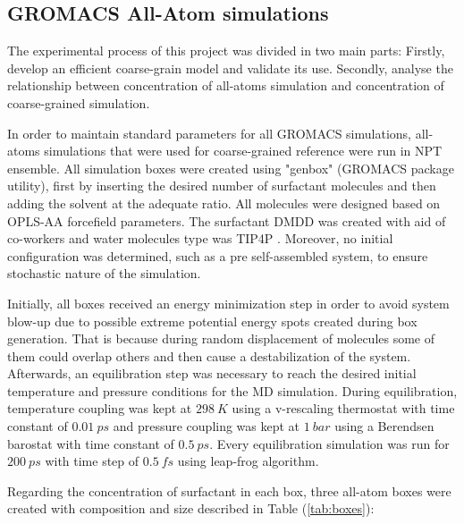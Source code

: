 \documentclass[10pt,a4paper,twoside]{article}
\begin{document}
\subsection{GROMACS All-Atom simulations}
The experimental process of this project was divided in two main parts: Firstly, develop an efficient coarse-grain model and validate its use. Secondly, analyse the relationship between concentration  of all-atoms simulation and concentration of coarse-grained simulation.

In order to maintain standard parameters for all GROMACS simulations, all-atoms simulations that were used for coarse-grained reference were run in NPT ensemble. All simulation boxes were created using "genbox" (GROMACS package utility), first by inserting the desired number of surfactant molecules and then adding the solvent at the adequate ratio. All molecules were designed based on OPLS-AA forcefield \cite{opls} parameters. %
The surfactant DMDD was created with aid of co-workers and water molecules type was TIP4P \cite{tip4p}. %
Moreover, no initial configuration was determined, such as a pre self-assembled system, to ensure stochastic nature of the simulation.  

Initially, all boxes received an energy minimization step in order to avoid system blow-up due to possible extreme potential energy spots created during box generation. That is because during random displacement of molecules some of them could overlap others and then cause a destabilization of the system. Afterwards, an equilibration step was necessary to reach the desired initial temperature and pressure conditions for the MD simulation. During equilibration, temperature coupling was kept at $298\ K$ using a v-rescaling thermostat \cite{vtstat} with time constant of $0.01\ ps$ and pressure coupling was kept at $1\ bar$ using a Berendsen barostat \cite{berend} with time constant of $0.5\ ps$.  Every equilibration simulation was run for $200\ ps$ with time step of $0.5\ fs$ using leap-frog algorithm.

Regarding the concentration of surfactant in each box, three all-atom boxes were created with composition and size described in Table (\ref{tab:boxes}):
\end{document}
